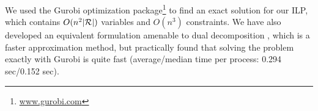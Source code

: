 We used the Gurobi optimization package\footnote{\url{www.gurobi.com}} to find an exact solution for our ILP, which contains $O(n^2|\mathcal{R}|)$ variables and $O(n^3)$ constraints. We have also developed an equivalent formulation amenable to dual decomposition \cite{dualdecomp}, which is a faster approximation method, but practically found that solving the problem exactly with Gurobi is quite fast (average/median time per process: 0.294 sec/0.152 sec).



